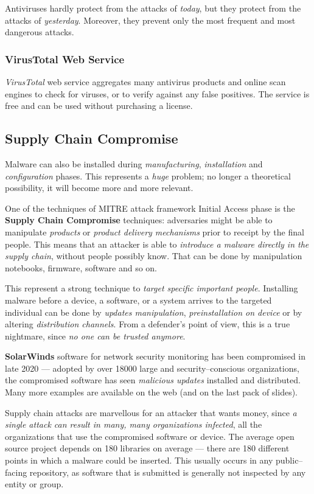 \documentclass[10pt]{\classname}
\begin{document}
Antiviruses hardly protect from the attacks of \emph{today}, but they protect
from the attacks of \emph{yesterday}. Moreover, they prevent only the most
frequent and most dangerous attacks.

\subsubsection{VirusTotal Web Service}

\emph{VirusTotal} web service aggregates many antivirus products and online
scan engines to check for viruses, or to verify against any false positives.
The service is free and can be used without purchasing a license.

\subsection{Supply Chain Compromise}

Malware can also be installed during \emph{manufacturing}, \emph{installation}
and \emph{configuration} phases. This represents a \emph{huge} problem; no
longer a theoretical possibility, it will become more and more relevant.

One of the techniques of MITRE attack framework Initial Access phase is the
\textbf{Supply Chain Compromise} techniques: adversaries might be able to
manipulate \emph{products} or \emph{product delivery mechanisms} prior to
receipt by the final people. This means that an attacker is able to
\emph{introduce a malware directly in the supply chain}, without people
possibly know. That can be done by manipulation notebooks, firmware, software
and so on.

This represent a strong technique to \emph{target specific important people}.
Installing malware before a device, a software, or a system arrives to the
targeted individual can be done by \emph{updates manipulation},
\emph{preinstallation on device} or by altering \emph{distribution channels}.
From a defender's point of view, this is a true nightmare, since \emph{no one
can be trusted anymore}.

\textbf{SolarWinds} software for network security monitoring has been
compromised in late 2020 --- adopted by over 18000 large and security--conscious
organizations, the compromised software has seen \emph{malicious updates}
installed and distributed. Many more examples are available on the web (and on
the last pack of slides).

Supply chain attacks are marvellous for an attacker that wants money, since
\emph{a single attack can result in many, many organizations infected}, all the
organizations that use the compromised software or device. The average open
source project depends on 180 libraries on average --- there are 180 different
points in which a malware could be inserted. This usually occurs in any
public--facing repository, as software that is submitted is generally not
inspected by any entity or group.
\end{document}
